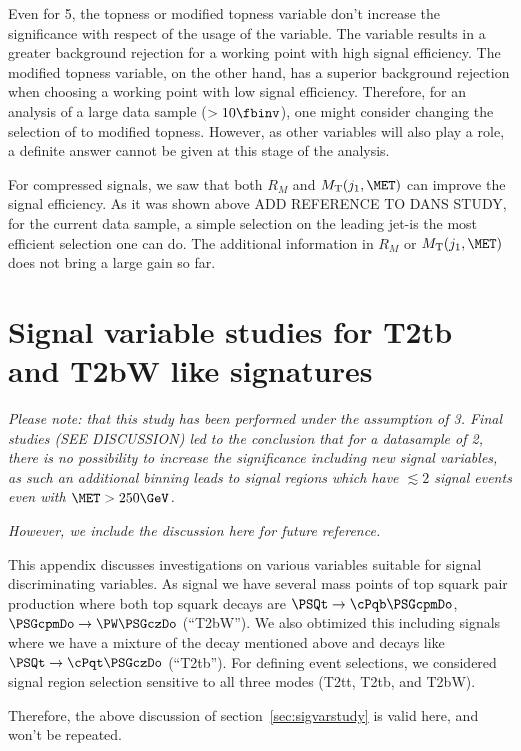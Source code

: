 Even for 5\fbinv, the topness or modified topness variable don't increase the significance with respect of the usage of the \MTtW variable. The \MTt variable results in a greater background rejection for a working point with high signal efficiency. The modified topness variable, on the other hand, has a superior background rejection when choosing a working point with low signal efficiency.
Therefore, for an analysis of a large data sample ($>10\fbinv$), one might consider changing the selection of \MTtW to modified topness. However, as other variables will also play a role, a definite answer cannot be given at this stage of the analysis.

For compressed signals, we saw that both $R_M$ and $\MT(j_1,\MET)$ can improve the signal efficiency. As it was shown above {\color{red} ADD REFERENCE TO DANS STUDY}, for the current data sample, a simple selection on the leading jet-\pt is the most efficient selection one can do. The additional information in $R_M$ or $\MT(j_1,\MET)$ does not bring a large gain so far.





\section{Signal variable studies for T2tb and T2bW like signatures}
\label{sec:sigvarstudy2}

\emph{Please note: that this study has been performed under the assumption of 3\fbinv. Final studies (SEE DISCUSSION) led to the conclusion that for a datasample of 2\fbinv, there is no possibility to increase the significance including new signal variables, as such an additional binning leads to signal regions which have $\lesssim2$ signal events even with $\MET>250\GeV$.}

\emph{However, we include the discussion here for future reference.}

This appendix discusses investigations on various variables suitable for signal discriminating variables. As signal we have several mass points of top squark pair production where both top squark decays are $\PSQt\to\cPqb\PSGcpmDo$, $\PSGcpmDo\to\PW\PSGczDo$ (``T2bW''). We also obtimized this including signals where we have a mixture of the decay mentioned above and decays like $\PSQt\to\cPqt\PSGczDo$ (``T2tb'').
For defining event selections, we considered signal region selection sensitive to all three modes (T2tt, T2tb, and T2bW).

Therefore, the above discussion of section~\ref{sec:sigvarstudy} is valid here, and won't be repeated.

